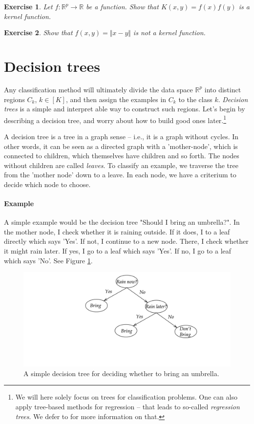 \documentclass{article}
\newcommand{\R}{\mathbb{R}}
\newtheorem{exercise}{Exercise}
\newcommand{\norm}[1]{\Vert #1 \Vert}
\begin{document}
\begin{exercise}
    Let $f: \R^p\to \R$ be a function. Show that $K(x,y)=f(x)f(y)$ is a kernel function.
\end{exercise}

\begin{exercise}
    Show that $f(x,y) = \norm{x-y}$ is \emph{not} a kernel function.
\end{exercise}





\section{Decision trees}
Any classification method will ultimately divide the data space $\R^p$ into distinct regions $C_k$, $k\in[K]$, and then assign the examples in $C_k$ to the class $k$.  \emph{Decision trees} is a simple and interpret able way to construct such regions. Let's begin by describing a decision tree, and  worry about how to build good ones later.\footnote{We will here solely focus on trees for classification problems. One can also apply tree-based methods for regression -- that leads to so-called \emph{regression trees}. We defer to \cite{james2023introduction} for more information on that.}

A decision tree is a tree in a graph sense -- i.e., it is a graph without cycles. In other words, it can be seen as a directed graph with a 'mother-node', which is connected to children, which themselves have children and so forth. The nodes without children are called \emph{leaves}. To classify an example, we traverse the tree from the 'mother node' down to a leave. In each node, we have a criterium to decide which node to choose.

\paragraph{Example} A simple example would be the decision tree "Should I bring an umbrella?". In the mother node, I check whether it is raining outside. If it does, I to a leaf directly which says 'Yes'. If not, I continue to a new node. There, I check whether it might rain later. If yes, I go to a leaf which says 'Yes'. If no, I go to a leaf which says 'No'. See Figure \ref{fig:Tree}. \newline

    \begin{figure}
        \centering
        \includegraphics[width=0.5\linewidth]{decision_tree.png}
        \caption{A simple decision tree for deciding whether to bring an umbrella.}
        \label{fig:Tree}
    \end{figure}
\end{document}
